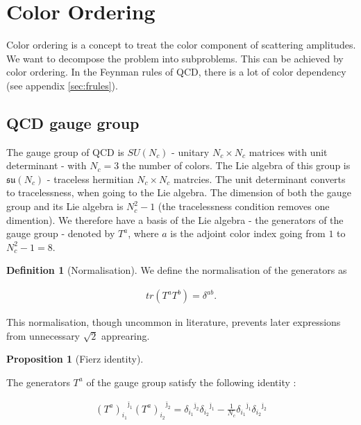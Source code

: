 \documentclass{article}
\theoremstyle{definition}
\newtheorem{definition}{Definition}[section]
\newtheorem{prop}[theorem]{Proposition}
\numberwithin{equation}{section}
\begin{document}
\section{Color Ordering}
\label{sec:colorordering}

Color ordering is a concept to treat the color component of scattering amplitudes. We want to decompose the problem into subproblems. This can be achieved by color ordering. In the Feynman rules of QCD, there is a lot of color dependency (see appendix \ref{sec:frules}).

\subsection{QCD gauge group}

The gauge group of QCD is $SU(N_c)$ - unitary $N_c \times N_c$ matrices with unit determinant - with $N_c = 3$ the number of colors. The Lie algebra of this group is $\mathfrak{su}(N_c)$ - traceless hermitian $N_c \times N_c$ matrcies. The unit determinant converts to tracelessness, when going to the Lie algebra. The dimension of both the gauge group and its Lie algebra is $N_c^2 - 1$ (the tracelessness condition removes one dimention). We therefore have a basis of the Lie algebra - the generators of the gauge group - denoted by $T^a$, where $a$ is the adjoint color index going from $1$ to $N_c^2 - 1 = 8$.

\begin{definition}[Normalisation]
\label{def:normalisation}
We define the normalisation of the generators as

\begin{align}
    tr (T^a T^b) = \delta^{ab}. \label{eq:normalisation}
\end{align}

This normalisation, though uncommon in literature, prevents later expressions from unnecessary $\sqrt{2}$ apprearing.

\end{definition}

\begin{prop}[Fierz identity]
\label{prop:fierz}

The generators $T^a$ of the gauge group satisfy the following identity \cite{bg87colorordering}:

\begin{align}
    {\left( T^a \right)_{i_1}}^{\bar{\jmath}_1} {\left( T^a \right)_{i_2}}^{\bar{\jmath}_2} = {\delta_{i_1}}^{\bar{\jmath}_2} {\delta_{i_2}}^{\bar{\jmath}_1} - \frac{1}{N_c} {\delta_{i_1}}^{\bar{\jmath}_1} {\delta_{i_2}}^{\bar{\jmath}_2} \label{eq:fierz2} 
\end{align}

\end{prop}
\end{document}
